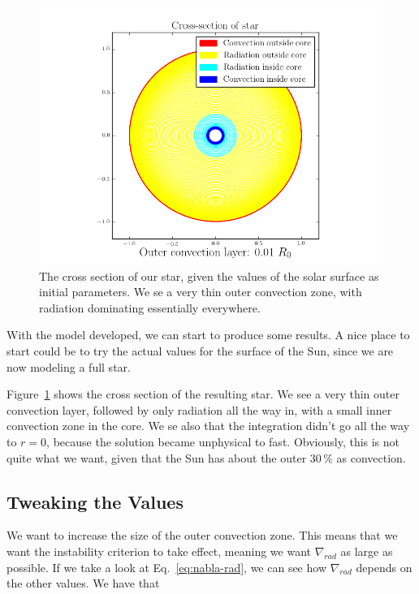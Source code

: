 \documentclass[11pt]{article}
\begin{document}
\begin{figure}
    \center
    \includegraphics[width=\linewidth]{fig/cross_section_default.png}
    \caption{\label{fig:cross section default} The cross section of our star, given the values of the solar surface as initial parameters. We se a very thin outer convection zone, with radiation dominating essentially everywhere. }
\end{figure}

With the model developed, we can start to produce some results. A nice place to start could be to try the actual values for the surface of the Sun, since we are now modeling a full star.

Figure~\ref{fig:cross section default} shows the cross section of the resulting star. We see a very thin outer convection layer, followed by only radiation all the way in, with a small inner convection zone in the core. We se also that the integration didn't go all the way to $r=0$, because the solution became unphysical to fast. Obviously, this is not quite what we want, given that the Sun has about the outer $30\,\%$ as convection.

\subsection{Tweaking the Values}
\label{sub:Tweaking the Values}

We want to increase the size of the outer convection zone. This means that we want the instability criterion to take effect, meaning we want $\nabla_{rad}$ as large as possible. If we take a look at Eq.~\eqref{eq:nabla-rad}, we can see how $\nabla_{rad}$ depends on the other values. We have that
\end{document}
